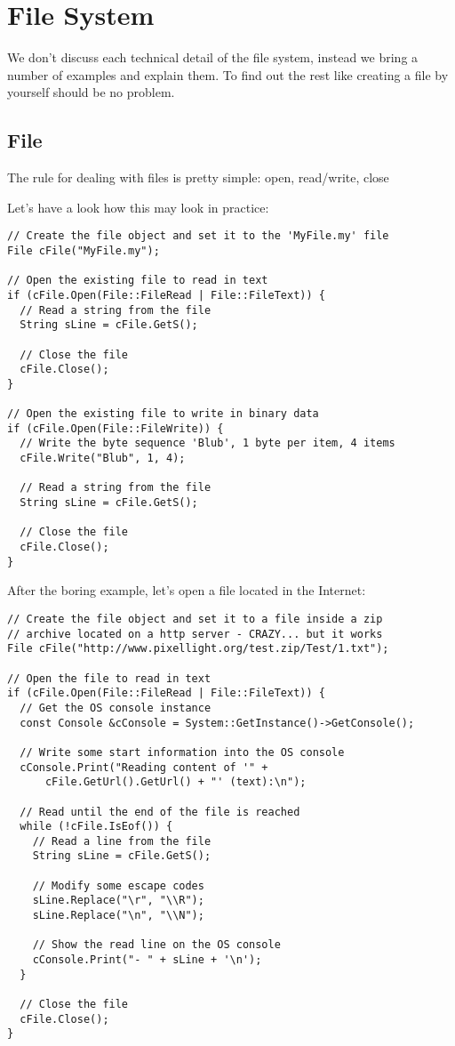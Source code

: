 \section{File System}
We don't discuss each technical detail of the file system, instead we bring a number of examples and explain them. To find out the rest like creating a file by yourself should be no problem.




\subsection{File}
The rule for dealing with files is pretty simple: open, read/write, close

Let's have a look how this may look in practice:

\begin{lstlisting}[caption=File usage example]
// Create the file object and set it to the 'MyFile.my' file
File cFile("MyFile.my");

// Open the existing file to read in text
if (cFile.Open(File::FileRead | File::FileText)) {
  // Read a string from the file
  String sLine = cFile.GetS();

  // Close the file
  cFile.Close();
}

// Open the existing file to write in binary data
if (cFile.Open(File::FileWrite)) {
  // Write the byte sequence 'Blub', 1 byte per item, 4 items
  cFile.Write("Blub", 1, 4);

  // Read a string from the file
  String sLine = cFile.GetS();

  // Close the file
  cFile.Close();
}
\end{lstlisting}

After the boring example, let's open a file located in the Internet:

\begin{lstlisting}[caption=http file usage example]
// Create the file object and set it to a file inside a zip
// archive located on a http server - CRAZY... but it works
File cFile("http://www.pixellight.org/test.zip/Test/1.txt");

// Open the file to read in text
if (cFile.Open(File::FileRead | File::FileText)) {
  // Get the OS console instance
  const Console &cConsole = System::GetInstance()->GetConsole();

  // Write some start information into the OS console
  cConsole.Print("Reading content of '" +
      cFile.GetUrl().GetUrl() + "' (text):\n");

  // Read until the end of the file is reached
  while (!cFile.IsEof()) {
    // Read a line from the file
    String sLine = cFile.GetS();

    // Modify some escape codes
    sLine.Replace("\r", "\\R");
    sLine.Replace("\n", "\\N");

    // Show the read line on the OS console
    cConsole.Print("- " + sLine + '\n');
  }

  // Close the file
  cFile.Close();
}
\end{lstlisting}




